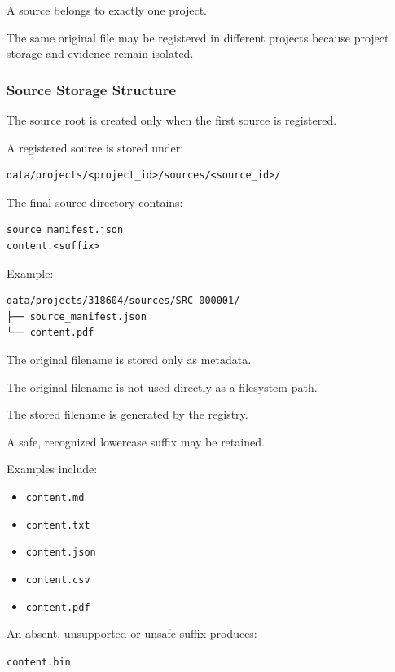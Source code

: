 A source belongs to exactly one project.

The same original file may be registered in different projects because project storage and evidence remain isolated.

\hypertarget{source-storage-structure}{%
\subsubsection{Source Storage Structure}\label{source-storage-structure}}

The source root is created only when the first source is registered.

A registered source is stored under:

\begin{verbatim}
data/projects/<project_id>/sources/<source_id>/
\end{verbatim}

The final source directory contains:

\begin{verbatim}
source_manifest.json
content.<suffix>
\end{verbatim}

Example:

\begin{verbatim}
data/projects/318604/sources/SRC-000001/
├── source_manifest.json
└── content.pdf
\end{verbatim}

The original filename is stored only as metadata.

The original filename is not used directly as a filesystem path.

The stored filename is generated by the registry.

A safe, recognized lowercase suffix may be retained.

Examples include:

\begin{itemize}
\tightlist
\item
  \texttt{content.md}
\item
  \texttt{content.txt}
\item
  \texttt{content.json}
\item
  \texttt{content.csv}
\item
  \texttt{content.pdf}
\end{itemize}

An absent, unsupported or unsafe suffix produces:

\texttt{content.bin}

